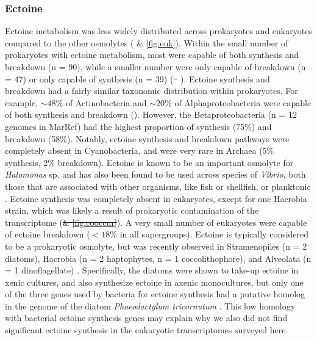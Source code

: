 \documentclass[utf8]{frontiersSCNS} %
\providecommand{\DIFaddtex}[1]{{\protect\color{blue}\uwave{#1}}} %
\providecommand{\DIFdeltex}[1]{{\protect\color{red}\sout{#1}}}                      %
\providecommand{\DIFaddbegin}{} %
\providecommand{\DIFaddend}{} %
\providecommand{\DIFdelbegin}{} %
\providecommand{\DIFdelend}{} %
\providecommand{\DIFadd}[1]{\texorpdfstring{\DIFaddtex{#1}}{#1}} %
\providecommand{\DIFdel}[1]{\texorpdfstring{\DIFdeltex{#1}}{}} %
\begin{document}
\subsubsection*{Ectoine}
Ectoine metabolism was less widely distributed across prokaryotes and eukaryotes compared to the other osmolytes ( \& \ref{fig:euk}). Within the small number of prokaryotes with ectoine metabolism, most were capable of both synthesis and breakdown (n = 90), while a smaller number were only capable of breakdown (n = 47) or only capable of synthesis (n = 39) (\DIFdelbegin \DIFdel{\mbox{%
}%
}\DIFdelend \DIFaddbegin \DIFadd{\mbox{%
}%
}\DIFaddend ). Ectoine synthesis and breakdown had a fairly similar taxonomic distribution within prokaryotes. For example, $\sim 48\%$ of Actinobacteria and $\sim20\%$ of Alphaproteobacteria were capable of both synthesis and breakdown (). However, the Betaproteobacteria (n = 12 genomes in MarRef) had the highest proportion of synthesis (75\%) and breakdown (58\%). Notably, ectoine synthesis and breakdown pathways were completely absent in Cyanobacteria, and were very rare in Archaea (5\% synthesis, 2\% breakdown). Ectoine is known to be an important osmolyte for \emph{Halomonas} sp. \citep{Ono1999} and has also been found to be used across species of \emph{Vibrio}, both those that are associated with other organisms, like fish or shellfish, or planktonic \DIFaddbegin \DIFadd{species }\DIFaddend \citep{Pflughoeft2003,Ongagna-Yhombi2013,Ma2017}. Ectoine synthesis was completely absent in eukaryotes, except for one Hacrobia strain, which was likely a result of prokaryotic contamination of the transcriptome (\DIFdelbegin \DIFdel{\& \ref{fig:cooccur}}\DIFdelend ). A very small number of eukaryotes were capable of ectoine breakdown ($< 18\%$ in all supergroups). Ectoine is typically considered to be a prokaryotic osmolyte, but was recently observed in Stramenopiles (n = 2 diatoms), Hacrobia (n = 2 haptophytes, n = 1 coccolithophore), and Alveolata (n = 1 dinoflagellate) \citep{Fenizia2020}. Specifically, the diatoms were shown to take-up ectoine in xenic cultures, and also synthesize ectoine in axenic monocultures, but only one of the three genes used by bacteria for ectoine synthesis had a putative homolog in the genome of the diatom \emph{Phaeodactylum tricornutum} \citep{Fenizia2020}. This low homology with bacterial ectoine synthesis genes may explain why we also did not find significant ectoine synthesis in the eukaryotic transcriptomes surveyed here.
\end{document}
